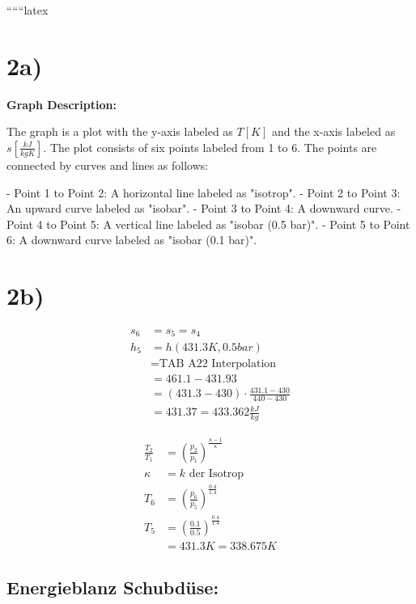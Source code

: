 
``````latex


\section*{2a)}

\begin{center}
\textbf{Graph Description:}
\end{center}

The graph is a plot with the y-axis labeled as \( T \left[ K \right] \) and the x-axis labeled as \( s \left[ \frac{kJ}{kgK} \right] \). The plot consists of six points labeled from 1 to 6. The points are connected by curves and lines as follows:

- Point 1 to Point 2: A horizontal line labeled as "isotrop".
- Point 2 to Point 3: An upward curve labeled as "isobar".
- Point 3 to Point 4: A downward curve.
- Point 4 to Point 5: A vertical line labeled as "isobar (0.5 bar)".
- Point 5 to Point 6: A downward curve labeled as "isobar (0.1 bar)".

\section*{2b)}

\begin{align*}
s_6 &= s_5 = s_4 \\
h_5 &= h(431.3K, 0.5 bar) \\
&= \text{TAB A22 Interpolation} \\
&= 461.1 - 431.93 \\
&= (431.3 - 430) \cdot \frac{431.1 - 430}{440 - 430} \\
&= 431.37 = 433.362 \frac{kJ}{kg}
\end{align*}

\begin{align*}
\frac{T_2}{T_1} &= \left( \frac{p_2}{p_1} \right)^{\frac{\kappa - 1}{\kappa}} \\
\kappa &= k \text{ der Isotrop} \\
T_6 &= \left( \frac{p_6}{p_5} \right)^{\frac{0.4}{1.4}} \\
T_5 &= \left( \frac{0.1}{0.5} \right)^{\frac{0.4}{1.4}} \\
&= 431.3K = 338.675K
\end{align*}

\subsection*{Energieblanz Schubdüse:}

